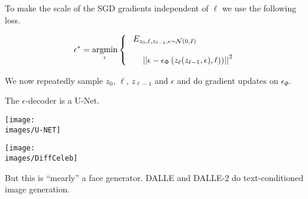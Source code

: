 {To make the scale of the SGD gradients independent of $\ell$ we use the following loss.

\vfill
$$\epsilon^* = \operatorname*{argmin}_{\epsilon}
\left\{\begin{array}{l}\;E_{z_0,\ell,z_{\ell-1},\epsilon \sim {\cal N}(0,I)}\; \\
\\
~\;\;\;\;\left|\left|\epsilon - \epsilon_\Phi\left(z_\ell(z_{\ell-1},\epsilon),\ell)\right)\right|\right|^2
\end{array}\right.$$

\vfill
We now repeatedly sample $z_0$, $\ell$, $z_{\ell-1}$ and $\epsilon$ and do gradient updates on $\epsilon_\Phi$.


The $\epsilon$-decoder is a U-Net.

\centerline{\texttt{[image: \\images/U-NET]}}


\centerline{\texttt{[image: \\images/DiffCeleb]}}

\vfill
But this is ``mearly'' a face generator. DALLE and DALLE-2 do text-conditioned image generation.
}

